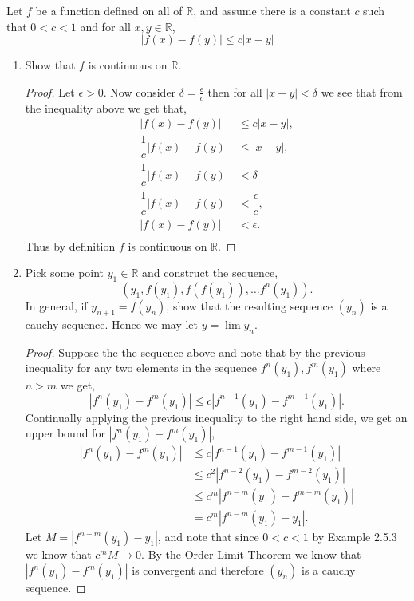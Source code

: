 \documentclass[12pt]{article}
\makeatletter
\theoremstyle{homework}
\newenvironment{exercise}[1]
{\def\@currentlabel{#1}\exercisecore}
{\endexercisecore}
\newcommand{\Reals}{\ensuremath{\mathbb R}}
\makeatother
\begin{document}
\begin{exercise}{4} Let $f$ be a function defined on all of $\Reals$, and assume there is a constant $c$ such that 
  $0<c<1$ and for all $x,y \in \Reals$,
  \begin{equation*}
    |f(x) - f(y)|\le c|x - y|
  \end{equation*}
  \begin{enumerate}
    \item Show that $f$ is continuous on $\Reals$.\\
    \begin{proof}
      Let $\epsilon > 0$. Now consider $\delta = \frac{\epsilon}{c}$ then for all $|x - y| < \delta$ we see that from the inequality above we get that,
      \begin{align*}
    |f(x) - f(y)|&\le c|x - y|,\\
    \dfrac{1}{c}|f(x) - f(y)|&\le |x - y|,\\
    \dfrac{1}{c}|f(x) - f(y)|&< \delta\\
    \dfrac{1}{c}|f(x) - f(y)|&< \dfrac{\epsilon}{c},\\
    |f(x) - f(y)|&< \epsilon.\\
      \end{align*}
      Thus by definition $f$ is continuous on $\Reals$.
    \end{proof}
    \vspace{.25in}


    \item Pick some point $y_1 \in \Reals$ and construct the sequence,
    \begin{equation*}
      (y_1,f(y_1),f(f(y_1)),\dots f^n(y_1)).
    \end{equation*}
    In general, if $y_{n+1} = f(y_n)$, show that the resulting sequence $(y_n)$ is a cauchy sequence. Hence we may let $y = \lim y_n$.\\

    \begin{proof}
      Suppose the the sequence above and note that by the previous inequality for any two elements in the sequence $f^n(y_1), f^m(y_1)$ where $n > m$ we get,
      \begin{equation*}
        |f^n(y_1) - f^m(y_1)|\le c|f^{n-1}(y_1) - f^{m-1}(y_1)|.
      \end{equation*}
      Continually applying the previous inequality to the right hand side, we get an upper bound for $|f^n(y_1) - f^m(y_1)|$,
      \begin{align*}
        |f^n(y_1) - f^m(y_1)|&\le c|f^{n-1}(y_1) - f^{m-1}(y_1)|\\
        &\le c^2|f^{n-2}(y_1) - f^{m-2}(y_1)|\\
        &\le c^m|f^{n-m}(y_1) - f^{m-m}(y_1)|\\
        &= c^m|f^{n-m}(y_1) - y_1|.
      \end{align*}
      Let $M = |f^{n-m}(y_1) - y_1|$, and note that since $0<c<1$ by Example 2.5.3 we know that $c^mM \to 0$. By the Order Limit Theorem we know that 
      $|f^n(y_1) - f^m(y_1)|$ is convergent and therefore $(y_n)$ is a cauchy sequence.
    \end{proof}
    \vspace{.25in}



\end{enumerate}
\end{exercise}
\end{document}
